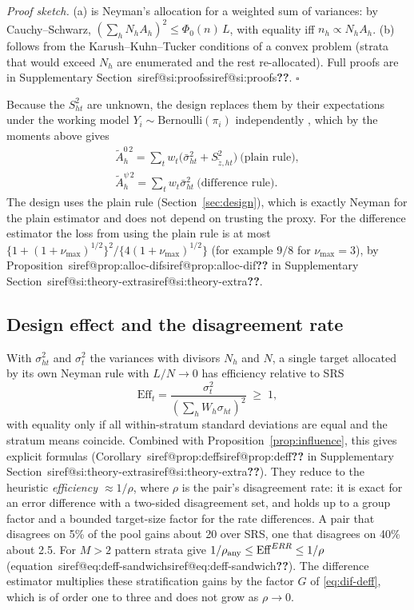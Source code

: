 \documentclass[pdflatex,sn-mathphys-num,iicol]{sn-jnl}
\makeatletter
\theoremstyle{thmstyleone}
\theoremstyle{thmstyletwo}
\theoremstyle{thmstylethree}
\newcommand{\SIref}[1]{\ifcsname siref@#1\endcsname\csname siref@#1\endcsname\else\textbf{??}\fi}
\makeatother
\begin{document}
\emph{Proof sketch.} (a) is Neyman's allocation \citep{neyman1934} for a weighted sum of variances: by Cauchy--Schwarz,
$(\sum_hN_hA_h)^2\le\Phi_0(n)\,L$, with equality iff $n_h\propto N_hA_h$. (b) follows from the Karush--Kuhn--Tucker conditions of a convex
problem (strata that would exceed $N_h$ are enumerated and the rest re-allocated). Full proofs are in Supplementary Section~\SIref{si:proofs}. $\square$

Because the $S^2_{ht}$ are unknown, the design replaces them by their expectations under the working model $Y_i\sim\text{Bernoulli}(\pi_i)$ independently
\citep[the anticipated variance of][]{isaki1982}, which by the moments above gives
\begin{equation}\label{eq:anticipated}
\begin{gathered}
\tilde A^{0\,2}_h=\sum_tw_t\big(\bar\sigma^2_{ht}+S^2_{\tilde z,ht}\big)\ \text{(plain rule)},\\
\tilde A^{\psi\,2}_h=\sum_tw_t\bar\sigma^2_{ht}\ \text{(difference rule)}.
\end{gathered}
\end{equation}
The design uses the plain rule (Section~\ref{sec:design}), which is exactly Neyman for the plain estimator and does not depend on trusting the proxy. For the difference
estimator the loss from using the plain rule is at most $\{1+(1+\nu_{\max})^{1/2}\}^2/\{4(1+\nu_{\max})^{1/2}\}$ (for example $9/8$ for $\nu_{\max}=3$),
by Proposition~\SIref{prop:alloc-dif} in Supplementary Section~\SIref{si:theory-extra}.

\subsection{Design effect and the disagreement rate}\label{sec:theory-deff}

With $\sigma^2_{ht}$ and $\sigma^2_t$ the variances with divisors $N_h$ and $N$, a single target allocated by its own Neyman rule with $L/N\to0$ has efficiency relative to SRS
\begin{equation}\label{eq:deff-general}
\mathrm{Eff}_t=\frac{\sigma_t^2}{(\sum_hW_h\sigma_{ht})^2}\;\ge\;1,
\end{equation}
with equality only if all within-stratum standard deviations are equal and the stratum means coincide. Combined with Proposition~\ref{prop:influence}, this gives explicit
formulas (Corollary~\SIref{prop:deff} in Supplementary Section~\SIref{si:theory-extra}). They reduce to the heuristic \emph{efficiency $\approx1/\rho$}, where $\rho$ is the pair's
disagreement rate: it is exact for an error difference with a two-sided disagreement set, and holds up to a group factor and a bounded target-size factor for the rate differences. A pair that disagrees on 5\% of the
pool gains about 20 over SRS, one that disagrees on 40\% about 2.5. For $M>2$ pattern strata give $1/\rho_{\rm any}\le\mathrm{Eff}^{ERR}\le1/\rho$ (equation~\SIref{eq:deff-sandwich}). The difference estimator multiplies these stratification gains by the factor $G$ of
\eqref{eq:dif-deff}, which is of order one to three and does not grow as $\rho\to0$.
\end{document}
